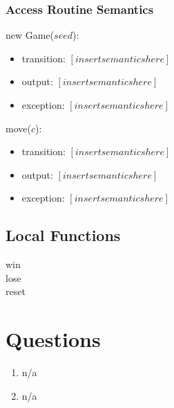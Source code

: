 \documentclass[12pt]{article}
\begin{document}
\subsubsection* {Access Routine Semantics}
\noindent new Game($seed$):
\begin{itemize}
    \item transition: $[insert semantics here]$
    \item output: $[insert semantics here]$
    \item exception: $[insert semantics here]$
\end{itemize}

\noindent move($c$):
\begin{itemize}
    \item transition: $[insert semantics here]$
    \item output: $[insert semantics here]$
    \item exception: $[insert semantics here]$
\end{itemize}


\subsection*{Local Functions}
win \\
lose \\
reset



\newpage
\section* {Questions}
\begin{enumerate}
    \item n/a
    \item n/a
\end{enumerate}
\end{document}
